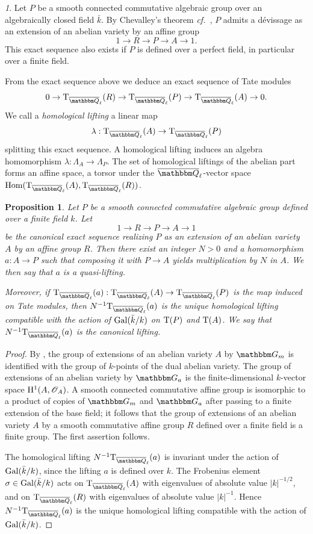 \documentclass[12pt,english]{smfart}
\numberwithin{equation}{subsection}
\newtheorem{proposition}[equation]{Proposition}
\theoremstyle{remark}
\newtheorem{numero}[equation]{}
\newcommand\calO{{\mathscr O}}
\newcommand\rmT{{\rm T}}
\newcommand\GG{{\mathbbm G}}
\newcommand\QQ{{\mathbbm Q}}
\newcommand\rmH{{\rm H}}
\newcommand\Gal{{\rm Gal}}
\newcommand\cf{{\it cf.\ }}
\newcommand\Ql{{\overline\QQ_\ell}}
\begin{document}
\begin{numero}\label{relevement homologique}
Let $P$ be a smooth connected commutative algebraic group over an algebraically closed field $\bar k$. By Chevalley's theorem \cf \cite{Ros}, $P$ admits a d\'evissage as an extension of an abelian variety by an affine group
$$1\rightarrow R\rightarrow P\rightarrow A\rightarrow 1.$$
This exact sequence also exists if $P$ is defined over a perfect field, in particular over a finite field.

From the exact sequence above we deduce an exact sequence of Tate modules
$$0\rightarrow \rmT_\Ql(R)\rightarrow \rmT_\Ql(P)\rightarrow \rmT_\Ql(A)\rightarrow 0.$$
We call a {\em homological lifting} a linear map
$$\lambda:\rmT_\Ql(A)\rightarrow \rmT_\Ql(P)$$
splitting this exact sequence. A homological lifting induces an algebra homomorphism $\lambda:\Lambda_A\rightarrow \Lambda_P$. The set of homological liftings of the abelian part forms an affine space, a torsor under the $\Ql$-vector space ${\rm Hom}(\rmT_\Ql(A),\rmT_\Ql(R))$.
\end{numero}

\begin{proposition}\label{quasi-relevement}
Let $P$ be a smooth connected commutative algebraic group defined over a finite field $k$. Let
$$1\rightarrow R\rightarrow P\rightarrow A\rightarrow 1$$
be the canonical exact sequence realizing $P$ as an extension of an abelian variety $A$ by an affine group $R$. Then there exist an integer $N>0$ and a homomorphism $a:A\rightarrow P$ such that composing it with $P\rightarrow A$ yields multiplication by $N$ in $A$. We then say that $a$ is a {\em quasi-lifting}.

Moreover, if $\rmT_\Ql(a):\rmT_\Ql(A)\rightarrow \rmT_\Ql(P)$ is the map induced on Tate modules, then $N^{-1}\rmT_\Ql(a)$ is the unique homological lifting compatible with the action of $\Gal(\bar k/k)$ on $\rmT(P)$ and $\rmT(A)$. We say that $N^{-1}\rmT_\Ql(a)$ is the {\em canonical lifting}.
\end{proposition}

\begin{proof}
By \cite[p.~184]{Serre-GACC}, the group of extensions of an abelian variety $A$ by $\GG_m$ is identified with the group of $k$-points of the dual abelian variety. The group of extensions of an abelian variety by $\GG_a$ is the finite-dimensional $k$-vector space $\rmH^1(A,\calO_A)$. A smooth connected commutative affine group is isomorphic to a product of copies of $\GG_m$ and $\GG_a$ after passing to a finite extension of the base field; it follows that the group of extensions of an abelian variety $A$ by a smooth commutative affine group $R$ defined over a finite field is a finite group. The first assertion follows.

The homological lifting $N^{-1}\rmT_\Ql(a)$ is invariant under the action of $\Gal(\bar k/k)$, since the lifting $a$ is defined over $k$. The Frobenius element $\sigma\in\Gal(\bar k/k)$ acts on $\rmT_\Ql(A)$ with eigenvalues of absolute value $|k|^{-1/2}$, and on $\rmT_\Ql(R)$ with eigenvalues of absolute value $|k|^{-1}$. Hence $N^{-1}\rmT_\Ql(a)$ is the unique homological lifting compatible with the action of $\Gal(\bar k/k)$.
\end{proof}
\end{document}
